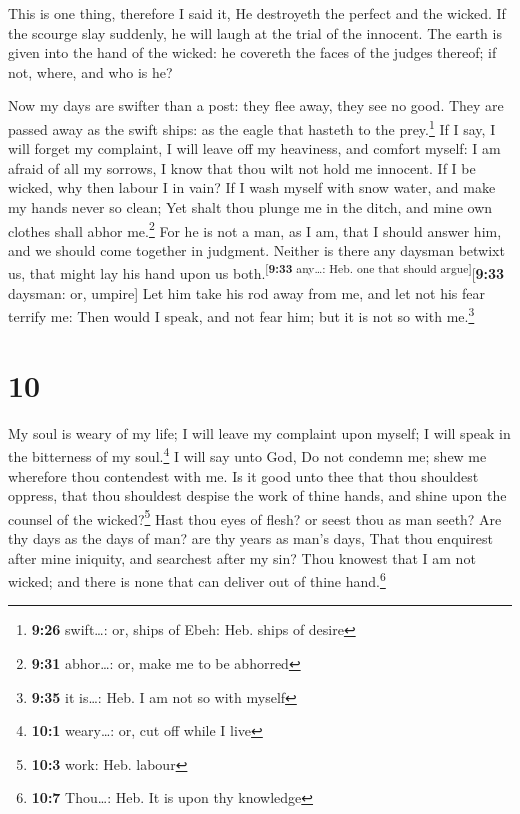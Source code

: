  This is one thing, therefore I said it, He destroyeth
the perfect and the wicked.  If the scourge slay
suddenly, he will laugh at the trial of the innocent. 
The earth is given into the hand of the wicked: he covereth the faces of
the judges thereof; if not, where, and who is he?

 Now my days are swifter than a post: they flee away,
they see no good.  They are passed away as the swift
ships: as the eagle that hasteth to the prey.\footnote{\textbf{9:26}
  swift\ldots: or, ships of Ebeh: Heb. ships of desire} 
If I say, I will forget my complaint, I will leave off my heaviness, and
comfort myself:  I am afraid of all my sorrows, I know
that thou wilt not hold me innocent.  If I be wicked, why
then labour I in vain?  If I wash myself with snow water,
and make my hands never so clean;  Yet shalt thou plunge
me in the ditch, and mine own clothes shall abhor me.\footnote{\textbf{9:31}
  abhor\ldots: or, make me to be abhorred}  For he is not
a man, as I am, that I should answer him, and we should come together in
judgment.  Neither is there any daysman betwixt us, that
might lay his hand upon us both.\textsuperscript{{[}\textbf{9:33}
any\ldots: Heb. one that should argue{]}}{[}\textbf{9:33} daysman: or,
umpire{]}  Let him take his rod away from me, and let not
his fear terrify me:  Then would I speak, and not fear
him; but it is not so with me.\footnote{\textbf{9:35} it is\ldots: Heb.
  I am not so with myself}

\hypertarget{section-9}{%
\section{10}\label{section-9}}

 My soul is weary of my life; I will leave my complaint
upon myself; I will speak in the bitterness of my soul.\footnote{\textbf{10:1}
  weary\ldots: or, cut off while I live}  I will say unto
God, Do not condemn me; shew me wherefore thou contendest with me.
 Is it good unto thee that thou shouldest oppress, that
thou shouldest despise the work of thine hands, and shine upon the
counsel of the wicked?\footnote{\textbf{10:3} work: Heb. labour}
 Hast thou eyes of flesh? or seest thou as man seeth?
 Are thy days as the days of man? are thy years as man's
days,  That thou enquirest after mine iniquity, and
searchest after my sin?  Thou knowest that I am not
wicked; and there is none that can deliver out of thine hand.\footnote{\textbf{10:7}
  Thou\ldots: Heb. It is upon thy knowledge}

